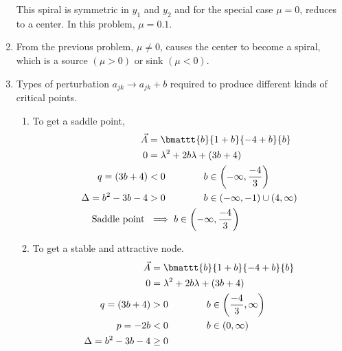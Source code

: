 \begin{enumerate}
          This spiral is symmetric in $ y_1 $ and $ y_2 $ and for the special
          case $ \mu = 0 $, reduces to a center. In this problem, $ \mu = 0.1 $.

    \item From the previous problem, $ \mu \neq 0 $, causes the center to become
          a spiral, which is a source $ (\mu > 0) $ or sink $ (\mu < 0) $.

    \item Types of perturbation $ a_{jk} \rightarrow a_{jk} + b $ required to
          produce different kinds of critical points.
          \begin{enumerate}
              \item To get a saddle point,
                    \begin{align}
                        \vec{A}               & = \bmattt{b}{1+b}{-4+b}{b}           \\
                        0                     & = \lambda^{2} + 2b\lambda + (3b + 4) \\
                        q = (3b+4)            & < 0 \qquad \qquad
                        b \in \left( -\infty, \frac{-4}{3} \right)                   \\
                        \Delta = b^2 - 3b - 4 & > 0 \qquad\qquad
                        b \in (-\infty,-1) \cup (4, \infty)                          \\
                        \text{Saddle point}\  & \implies b \in
                        \left( -\infty, \frac{-4}{3} \right)
                    \end{align}
              \item To get a stable and attractive node.
                    \begin{align}
                        \vec{A}                             & = \bmattt{b}{1+b}{-4+b}{b}           \\
                        0                                   & = \lambda^{2} + 2b\lambda + (3b + 4) \\
                        q = (3b+4)                          & > 0 \qquad \qquad
                        b \in \left( \frac{-4}{3}, \infty \right)                                  \\
                        p = -2b                             & < 0 \qquad\qquad
                        b \in (0, \infty)                                                          \\
                        \Delta = b^2 - 3b - 4               & \geq 0 \qquad\qquad

\end{align}
\end{enumerate}
\end{enumerate}
